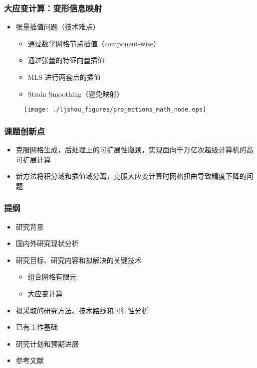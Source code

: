\documentclass[mathserif]{beamer}
\begin{document}
\begin{CJK}{UTF8}{gkai}
\begin{frame}
	\frametitle{大应变计算：变形信息映射}	
	\begin{itemize}
		\item 张量插值问题（技术难点）
		\begin{itemize}
			\item 通过数学网格节点插值（component-wise）
			\item 通过张量的特征向量插值
			\item MLS 进行两套点的插值
			\item Strain Smoothing（避免映射）
		\end{itemize}
	\end{itemize}
	\begin{figure}
		\centering
		\texttt{[image: ./ljshou\_figures/projections\_math\_node.eps]}
	\end{figure}
\end{frame}

\begin{frame}
	\frametitle{课题创新点}
	\begin{itemize}
		\item 克服网格生成，后处理上的可扩展性瓶颈，实现面向千万亿次超级计算机的高可扩展计算
		\item 新方法将积分域和插值域分离，克服大应变计算时网格扭曲导致精度下降的问题
	\end{itemize}
\end{frame}


	\begin{frame}
        \frametitle{提纲}
        \begin{itemize}
            \color{gray} 
            \item 研究背景
            \item 国内外研究现状分析
            \item 研究目标、研究内容和拟解决的关键技术
		  	\begin{itemize}
		    		\color{gray}
		  		\item 组合网格有限元
				\item 大应变计算
		  	\end{itemize}
            \item 拟采取的研究方法、技术路线和可行性分析
            \item {\color{blue}已有工作基础}
	    \item 研究计划和预期进展
            \item 参考文献
        \end{itemize}
	\end{frame}
	

\end{CJK}
\end{document}
